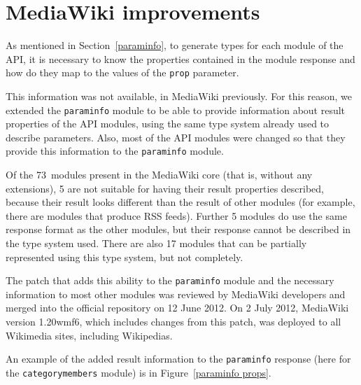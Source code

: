 \chapter{MediaWiki improvements}
\label{mw improvements}

As mentioned in Section~\ref{paraminfo}, to generate types for each module of the \ac{API},
it is necessary to know the properties contained in the module response
and how do they map to the values of the \texttt{prop} parameter.

This information was not available, in MediaWiki previously.
For this reason, we extended the \texttt{paraminfo} module
to be able to provide information about result properties
of the \ac{API} modules, using the same type system already used to describe parameters.
Also, most of the \ac{API} modules were changed so that they provide this information to the \texttt{paraminfo} module.

Of the 73~modules present in the MediaWiki core (that is, without any extensions),
5 are not suitable for having their result properties described,
because their result looks different than the result of other modules (for example, there are modules that produce \acs{RSS} feeds).
Further 5 modules do use the same response format as the other modules,
but their response cannot be described in the type system used.
There are also 17 modules that can be partially represented using this type system, but not completely.

The patch that adds this ability to the \texttt{paraminfo} module and the necessary
information to most other modules was reviewed by MediaWiki developers and merged into the official repository
on 12 June 2012.
On 2 July 2012, MediaWiki version 1.20wmf6, which includes changes from this patch, was deployed to all Wikimedia sites, including Wikipedias.

An example of the added result information to the \texttt{paraminfo} response (here for the \texttt{categorymembers} module) is in Figure~\ref{paraminfo props}.

\medskip

